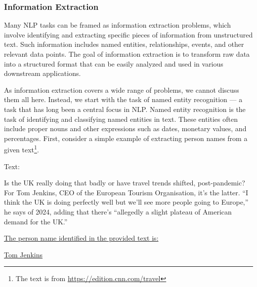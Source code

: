 \subsubsection{Information Extraction}

\noindent Many NLP tasks can be framed as information extraction problems, which involve identifying and extracting specific pieces of information from unstructured text. Such information includes named entities, relationships, events, and other relevant data points. The goal of information extraction is to transform raw data into a structured format that can be easily analyzed and used in various downstream applications.

As information extraction covers a wide range of problems, we cannot discuss them all here. Instead, we start with the task of named entity recognition --- a task that has long been a central focus in NLP. Named entity recognition is the task of identifying and classifying named entities in text. These entities often include proper nouns and other expressions such as dates, monetary values, and percentages. First, consider a simple example of extracting person names from a given text\footnote{The text is from \url{https://edition.cnn.com/travel}}.

\vspace{0.5em}
\begin{tcolorbox}

\begingroup
\setlength{\leftskip}{2em}
\setlength{\rightskip}{2em}


\vspace{0.7em}

Text:

Is the UK really doing that badly or have travel trends shifted, post-pandemic? For Tom Jenkins, CEO of the European Tourism Organisation, it's the latter. ``I think the UK is doing perfectly well but we'll see more people going to Europe,'' he says of 2024, adding that there's ``allegedly a slight plateau of American demand for the UK.''

\vspace{0.7em}

\underline{The person name identified in the provided text is:}

\vspace{0.3em}

\underline{Tom Jenkins}

\endgroup

\end{tcolorbox}
\vspace{0.5em}

